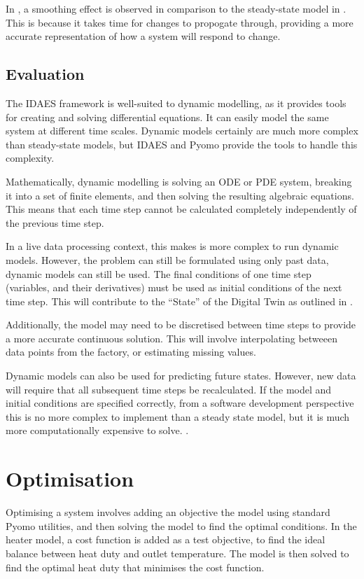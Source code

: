 \documentclass[12pt]{article}
\begin{document}
In , a smoothing effect is observed in comparison to the steady-state model in . This is because it takes time for changes to propogate through, providing a more accurate representation of how a system will respond to change.

\subsection{Evaluation}
The IDAES framework is well-suited to dynamic modelling, as it provides tools for creating and solving differential equations. It can easily model the same system at different time scales. Dynamic models certainly are much more complex than steady-state models, but IDAES and Pyomo provide the tools to handle this complexity.

Mathematically, dynamic modelling is solving an ODE or PDE system, breaking it into a set of finite elements, and then solving the resulting algebraic equations. This means that each time step cannot be calculated completely independently of the previous time step.

In a live data processing context, this makes is more complex to run dynamic models. 
However, the problem can still be formulated using only past data, dynamic models can still be used.
The final conditions of one time step (variables, and their derivatives) must be used as initial conditions of the next time step. This will contribute to the ``State'' of the Digital Twin as outlined in .

Additionally, the model may need to be discretised between time steps to provide a more accurate continuous solution. This will involve interpolating betweeen data points from the factory, or estimating missing values.


Dynamic models can also be used for predicting future states. However, new data will require that all subsequent time steps be recalculated. 
If the model and initial conditions are specified correctly, from a software development perspective this is no more complex to implement than a steady state model, but it is much more computationally expensive to solve. 
.

\section{Optimisation}
Optimising a system involves adding an objective the model using standard Pyomo utilities, and then solving the model to find the optimal conditions. In the heater model, a cost function is added as a test objective, to find the ideal balance between heat duty and outlet temperature. The model is then solved to find the optimal heat duty that minimises the cost function.
\end{document}
